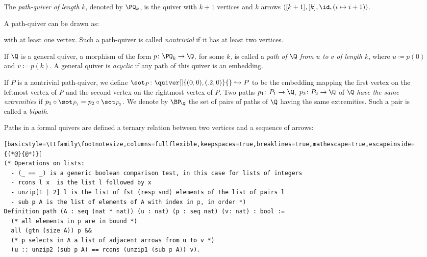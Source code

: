 \begin{definition}\label{def:pathquiv}
  The \emph{path-quiver of length $k$}, denoted by $\PQ_k$, is the quiver
  with $k+1$ vertices and $k$ arrows $([k+1], [k], \id, (i \mapsto i + 1))$.
\end{definition}

A path-quiver can be drawn as:
\begin{center} 
\end{center}
with at least one vertex. Such a path-quiver is called \emph{nontrivial} if it has at least two vertices.

If $\Q$ is a general quiver, a morphism of the form $p\colon \PQ_k \to \Q$, for some $k$, is called a \emph{path of\/ $\Q$ from $u$ to $v$ of length $k$}, where $u \coloneqq p(0)$ and $v \coloneqq p(k)$. A general quiver is \emph{acyclic} if any path of this quiver is an embedding.

If $P$ is a nontrivial path-quiver, we define $\sot_P\colon \quiver[]{(0,0),(.2,0)}{} \hookrightarrow P$ to be the embedding mapping the first vertex on the leftmost vertex of $P$ and the second vertex on the rightmost vertex of $P$. Two paths $p_1\colon P_1 \to \Q$, $p_2\colon P_2 \to \Q$ of $\Q$ \emph{have the same extremities} if $p_1 \circ \sot_{P_1} = p_2 \circ \sot_{P_2}$. We denote by $\BP_{\!\Q}$ the set of pairs of paths of $\Q$ having the same extremities. Such a pair is called a \emph{bipath}.

Paths in a formal quivers are defined a ternary relation between two vertices and a sequence of arrows:
\begin{lstlisting}[basicstyle=\ttfamily\footnotesize,columns=fullflexible,keepspaces=true,breaklines=true,mathescape=true,escapeinside={(*@}{@*)}]
(* Operations on lists:
  - (_ == _) is a generic boolean comparison test, in this case for lists of integers
  - rcons l x  is the list l followed by x
  - unzip[1 | 2] l is the list of fst (resp snd) elements of the list of pairs l
  - sub p A is the list of elements of A with index in p, in order *)
Definition path (A : seq (nat * nat)) (u : nat) (p : seq nat) (v: nat) : bool :=
  (* all elements in p are in bound *)
  all (gtn (size A)) p &&
  (* p selects in A a list of adjacent arrows from u to v *)
  (u :: unzip2 (sub p A) == rcons (unzip1 (sub p A)) v).
\end{lstlisting}

